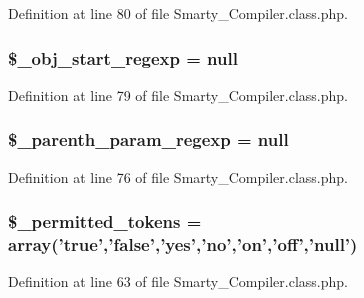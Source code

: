 \-Definition at line 80 of file \-Smarty\-\_\-\-Compiler.\-class.\-php.

\hypertarget{class_smarty___compiler_ae747722d6f0e65f4bf8507ef1d0652ef}{
\subsubsection[{\$\-\_\-obj\-\_\-start\-\_\-regexp}]{\setlength{\rightskip}{0pt plus 5cm}\$\-\_\-obj\-\_\-start\-\_\-regexp = null}}\label{class_smarty___compiler_ae747722d6f0e65f4bf8507ef1d0652ef}


\-Definition at line 79 of file \-Smarty\-\_\-\-Compiler.\-class.\-php.

\hypertarget{class_smarty___compiler_a1852ec685e34c7c0151a339508706ade}{
\subsubsection[{\$\-\_\-parenth\-\_\-param\-\_\-regexp}]{\setlength{\rightskip}{0pt plus 5cm}\$\-\_\-parenth\-\_\-param\-\_\-regexp = null}}\label{class_smarty___compiler_a1852ec685e34c7c0151a339508706ade}


\-Definition at line 76 of file \-Smarty\-\_\-\-Compiler.\-class.\-php.

\hypertarget{class_smarty___compiler_ad2fab67ee277e3420a9add51850c52cd}{
\subsubsection[{\$\-\_\-permitted\-\_\-tokens}]{\setlength{\rightskip}{0pt plus 5cm}\$\-\_\-permitted\-\_\-tokens = array('true','false','yes','no','on','off','null')}}\label{class_smarty___compiler_ad2fab67ee277e3420a9add51850c52cd}


\-Definition at line 63 of file \-Smarty\-\_\-\-Compiler.\-class.\-php.

